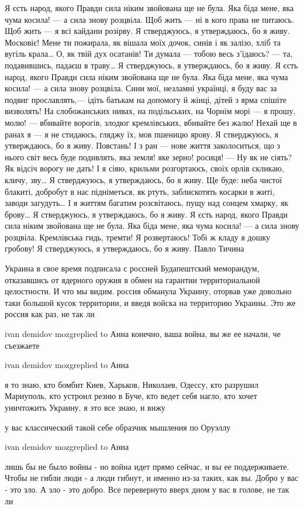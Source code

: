 Я єсть народ, якого Правди сила
ніким звойована ще не була.
Яка біда мене, яка чума косила! —
а сила знову розцвіла.
Щоб жить — ні в кого права не питаюсь.
Щоб жить — я всі кайдани розірву.
Я стверджуюсь, я утверждаюсь,
бо я живу.
Московіє! Мене ти пожирала,
як вішала моїх дочок, синів
і як залізо, хліб та вугіль крала…
О, як твій дух осатанів!
Ти думала — тобою весь з'їдаюсь? —
та, подавившись, падаєш в траву…
Я стверджуюсь, я утверждаюсь,
бо я живу.
Я єсть народ, якого Правди сила
ніким звойована ще не була.
Яка біда мене, яка чума косила! —
а сила знову розцвіла.
Сини мої, незламні українці,
я буду вас за подвиг прославлять,—
ідіть батькам на допомогу й жінці,
дітей з ярма спішіте визволять!
На слобожанських нивах, на подільських,
на Чорнім морі — я прошу, молю! —
вбивайте ворогів, злодюг кремлівських,
вбивайте без жалю!
Нехай ще в ранах я — я не стидаюсь,
гляджу їх, мов пшеницю ярову.
Я стверджуюсь, я утверждаюсь,
бо я живу.
Повстань! І з ран — нове життя заколоситься,
що з нього світ весь буде подивлять,
яка земля! яке зерно! росиця! —
Ну як не сіять? Як відсіч ворогу не дать!
І я сіяю, крильми розгортаюсь,
своїх орлів скликаю, кличу, зву…
Я стверджуюсь, я утверждаюсь,
бо я живу.
Ще буде: неба чистої блакиті,
добробут в нас підніметься, як ртуть,
заблискотять косарки в житі,
заводи загудуть…
І я життям багатим розсвітаюсь,
пущу над сонцем хмарку, як брову…
Я стверджуюсь, я утверждаюсь,
бо я живу.
Я єсть народ, якого Правди сила
ніким звойована ще не була.
Яка біда мене, яка чума косила! —
а сила знову розцвіла.
Кремлівська гидь, тремти! Я розвертаюсь!
Тобі ж кладу я дошку гробову!
Я стверджуюсь, я утверждаюсь,
бо я живу.
Павло Тичина

Украина в свое время подписала с россией Будапештский меморандум, отказавшись
от ядерного оружия в обмен на гарантии территориальной целостности. И что мы
видим. россия обманула Украину, оторвав уже довольно таки большой кусок
территории, и введя войска на территорию Украины. Это же россия как раз, не так
ли

ivan demidov mozgreplied to Анна
конечно, ваша война, вы же ее начали, че съезжаете

ivan demidov mozgreplied to Анна

я то знаю, кто бомбит Киев, Харьков, Николаев, Одессу, кто разрушил Мариуполь,
кто устроил резню в Буче, кто ведет себя нагло, кто хочет уничтожить Украину, я
это все знаю, и вижу

у вас классический такой себе образчик мышления по Оруэллу

ivan demidov mozgreplied to Анна

лишь бы не было войны - но война идет прямо сейчас, и вы ее поддерживаете.
Чтобы не гибли люди - а люди гибнут, и именно из-за таких, как вы. Добро у вас
- это зло. А зло - это добро. Все перевернуто вверх дном у вас в голове, не так
ли


